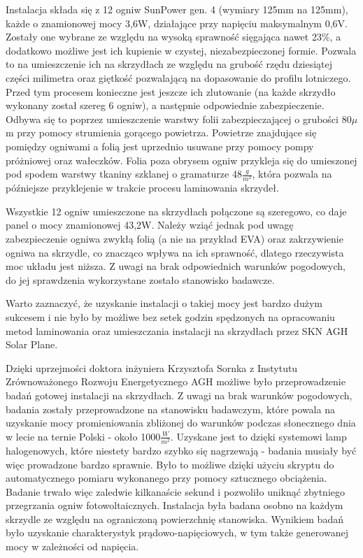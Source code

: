\documentclass[12pt, a4paper]{article}
\begin{document}
Instalacja składa się z 12 ogniw SunPower gen. 4 (wymiary 125mm na 125mm), każde o znamionowej mocy 3,6W, działające przy napięciu maksymalnym 0,6V. Zostały one wybrane ze względu na wysoką sprawność sięgająca nawet 23\%, a dodatkowo możliwe jest ich kupienie w czystej, niezabezpieczonej formie. Pozwala to na umieszczenie ich na skrzydłach ze względu na grubość rzędu dziesiątej części milimetra oraz giętkość pozwalającą na dopasowanie do profilu lotniczego. Przed tym procesem konieczne jest jeszcze ich zlutowanie (na każde skrzydło wykonany został szereg 6 ogniw), a następnie odpowiednie zabezpieczenie. Odbywa się to poprzez umieszczenie warstwy folii zabezpieczającej o grubości 80$\mu$m przy pomocy strumienia gorącego powietrza. Powietrze znajdujące się pomiędzy ogniwami a folią jest uprzednio usuwane przy pomocy pompy próżniowej oraz wałeczków. Folia poza obrysem ogniw przykleja się do umieszonej pod spodem warstwy tkaniny szklanej o gramaturze 48$\frac{g}{m^2}$, która pozwala na późniejsze przyklejenie w trakcie procesu laminowania skrzydeł. 

Wszystkie 12 ogniw umieszczone na skrzydłach połączone są szeregowo, co daje panel o mocy znamionowej 43,2W. Należy wziąć jednak pod uwagę zabezpieczenie ogniwa zwykłą folią (a nie na przykład EVA) oraz zakrzywienie ogniwa na skrzydle, co znacząco wpływa na ich sprawność, dlatego rzeczywista moc układu jest niższa. Z uwagi na brak odpowiednich warunków pogodowych, do jej sprawdzenia wykorzystane zostało stanowisko badawcze.

Warto zaznaczyć, że uzyskanie instalacji o takiej mocy jest bardzo dużym sukcesem i nie było by możliwe bez setek godzin spędzonych na opracowaniu metod laminowania oraz umieszczania instalacji na skrzydłach przez SKN AGH Solar Plane.

Dzięki uprzejmości doktora inżyniera Krzysztofa Sornka z Instytutu Zrównoważonego Rozwoju Energetycznego AGH możliwe było przeprowadzenie badań gotowej instalacji na skrzydłach. Z uwagi na brak warunków pogodowych, badania zostały przeprowadzone na stanowisku badawczym, które powala na uzyskanie mocy promieniowania zbliżonej do warunków podczas słonecznego dnia w lecie na ternie Polski - około 1000$\frac{W}{m^2}$. Uzyskane jest to dzięki systemowi lamp halogenowych, które niestety bardzo szybko się nagrzewają - badania musiały być więc prowadzone bardzo sprawnie. Było to możliwe dzięki użyciu skryptu do automatycznego pomiaru wykonanego przy pomocy sztucznego obciążenia. Badanie trwało więc zaledwie kilkanaście sekund i pozwoliło uniknąć zbytniego przegrzania ogniw fotowoltaicznych. Instalacja była badana osobno na każdym skrzydle ze względu na ograniczoną powierzchnię stanowiska. Wynikiem badań było uzyskanie charakterystyk prądowo-napięciowych, w tym także generowanej mocy w zależności od napięcia.
\end{document}
